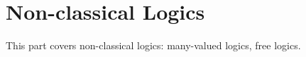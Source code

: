 \documentclass[../../include/open-logic-part]{subfiles}
\begin{document}
\part{Non-classical Logics}

\begin{editorial}
  This part covers non-classical logics: many-valued logics, free logics.
\end{editorial}


\OLEndPartHook
\end{document}
